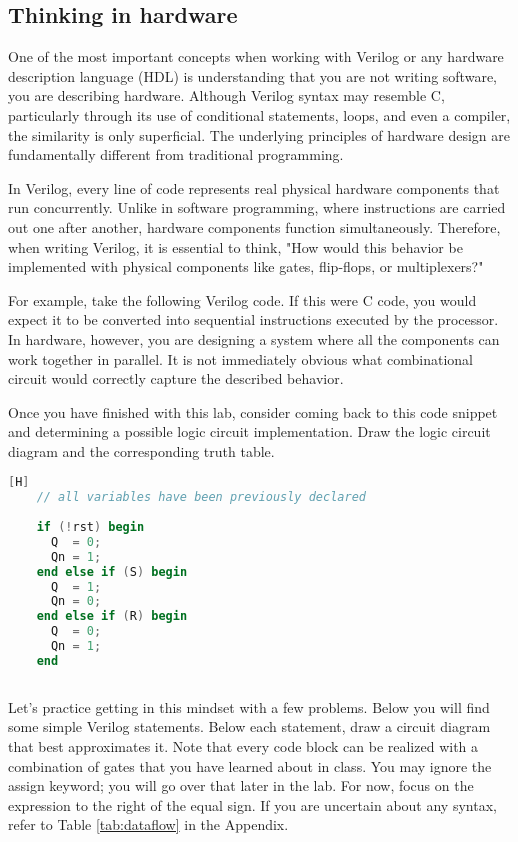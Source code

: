 \documentclass[12pt]{journal}
\begin{document}
\subsection{Thinking in hardware}
One of the most important concepts when working with Verilog or any hardware description language (HDL) is understanding that you are not writing software, you are describing hardware. Although Verilog syntax may resemble C, particularly through its use of conditional statements, loops, and even a compiler, the similarity is only superficial. The underlying principles of hardware design are fundamentally different from traditional programming.

In Verilog, every line of code represents real physical hardware components that run concurrently. Unlike in software programming, where instructions are carried out one after another, hardware components function simultaneously. Therefore, when writing Verilog, it is essential to think, "How would this behavior be implemented with physical components like gates, flip-flops, or multiplexers?"

For example, take the following Verilog code. If this were C code, you would expect it to be converted into sequential instructions executed by the processor. In hardware, however, you are designing a system where all the components can work together in parallel. It is not immediately obvious what combinational circuit would correctly capture the described behavior.

\begin{bonusquestion}
Once you have finished with this lab, consider coming back to this code snippet and determining a possible logic circuit implementation. Draw the logic circuit diagram and the corresponding truth table.
\end{bonusquestion}

\begin{lstlisting}[language=Verilog][H]
    // all variables have been previously declared
    
    if (!rst) begin
      Q  = 0;
      Qn = 1;
    end else if (S) begin
      Q  = 1;
      Qn = 0;
    end else if (R) begin
      Q  = 0;
      Qn = 1;
    end
    
\end{lstlisting}
\clearpage
\begin{question}[Practice]
    Let's practice getting in this mindset with a few problems. Below you will find some simple Verilog statements. Below each statement, draw a circuit diagram that best approximates it. Note that every code block can be realized with a combination of gates that you have learned about in class. You may ignore the assign keyword; you will go over that later in the lab. For now, focus on the expression to the right of the equal sign. If you are uncertain about any syntax, refer to Table \ref{tab:dataflow} in the Appendix.
\end{question}
\end{document}

